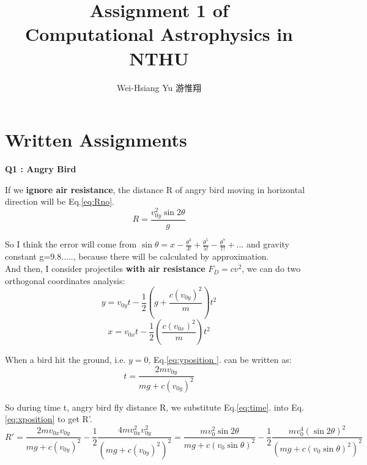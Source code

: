 \documentclass{article}
\title{Assignment 1 of \\Computational Astrophysics in NTHU}
\author{Wei-Hsiang Yu 游惟翔}
\begin{document}
\begin{CJK}{UTF8}{bsmi}
\maketitle
\end{CJK}


\section{Written Assignments}

\textbf{Q1 : Angry Bird\\}

If we \textbf{ignore air resistance}, the distance R of angry bird moving in horizontal direction will be Eq.\ref{eq:Rno}.
\begin{equation}
    R = \frac{v_{0y}^2\sin{2\theta}}{g}
    \label{eq:Rno}
\end{equation}

So I think the error will come from $\sin{\theta}=x-\frac{\theta^3}{3!}+\frac{\theta^5}{5!}-\frac{\theta^7}{7!}+...$
and gravity constant g=9.8....., because there will be calculated by approximation.\\

And then, I consider projectiles \textbf{with air resistance} $F_{D}=cv^2$, we can do two orthogonal coordinates analysis:
\begin{equation}
    y = v_{0y}t-\frac{1}{2}(g+\frac{c(v_{0y})^2}{m})t^2
    \label{eq:yposition }
\end{equation}
\begin{equation}
    x = v_{0x}t-\frac{1}{2}(\frac{c(v_{0x})^2}{m})t^2
    \label{eq:xposition}
\end{equation}

When a bird hit the ground, i.e. $y=0$, Eq.\ref{eq:yposition }. can be written as:
\begin{equation}
    t =\frac{2mv_{0y}}{mg+c(v_{0y})^2}
    \label{eq:time}
\end{equation}

So during time t, angry bird fly distance R, we substitute Eq.\ref{eq:time}. into Eq.\ref{eq:xposition} to get R'.
\begin{equation}
    R' =\frac{2mv_{0x}v_{0y}}{mg+c(v_{0y})^2}
    -\frac{1}{2}\frac{4mv_{0x}^2v_{0y}^2}{(mg+c(v_{0y})^2)^2}=
    \frac{mv_{0}^2\sin{2\theta}}{mg+c(v_{0}\sin{\theta})^2}-
    \frac{1}{2}\frac{mv_{0}^4(\sin{2\theta})^2}{(mg+c(v_{0}\sin{\theta})^2)^2}
    \label{eq:R}
\end{equation}
\end{document}
